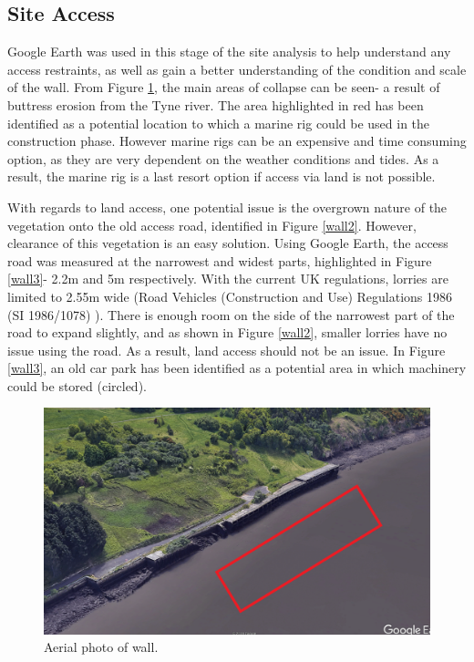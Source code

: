 \documentclass[12pt, a4paper]{article}
\begin{document}
\subsection{Site Access}
\begin{justify}
Google Earth was used in this stage of the site analysis to help understand any access restraints, as well as gain a better understanding of the condition and scale of the wall. From Figure \ref{wall}, the main areas of collapse can be seen- a result of buttress erosion from the Tyne river. The area highlighted in red has been identified as a potential location to which a marine rig could be used in the construction phase. However marine rigs can be an expensive and time consuming option, as they are very dependent on the weather conditions and tides. As a result, the marine rig is a last resort option if access via land is not possible. 
\end{justify}
\begin{justify}
With regards to land access, one potential issue is the overgrown nature of the vegetation onto the old access road, identified in Figure \ref{wall2}. However, clearance of this vegetation is an easy solution. Using Google Earth, the access road was measured at the narrowest and widest parts, highlighted in Figure \ref{wall3}- 2.2m and 5m respectively. With the current UK regulations, lorries are limited to 2.55m wide (Road Vehicles (Construction and Use) Regulations
1986 (SI 1986/1078) \cite{a}). There is enough room on the side of the narrowest part of the road to expand slightly, and as shown in Figure \ref{wall2}, smaller lorries have no issue using the road. As a result, land access should not be an issue. In Figure \ref{wall3}, an old car park has been identified as a potential area in which machinery could be stored (circled).
\end{justify}
\begin{figure}[H]
  \centering
  	\includegraphics[width=0.5\textheight]{wall}
   	\caption{Aerial photo of wall.}
	\label{wall}
\end{figure}
\end{document}
